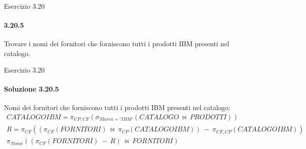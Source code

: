 %
\begin{frame}{Esercizio 3.20}
    \framesubtitle{3.20.5}
    \vspace{-3.cm}
    \vspace{.3cm}

    Trovare i nomi dei fornitori che forniscono tutti i prodotti IBM presenti nel catalogo.
\end{frame}
%
\begin{frame}{Esercizio 3.20}
    \framesubtitle{Soluzione 3.20.5}
    \vspace*{-2cm}
    \vspace{.3cm}

    {\small Nomi dei fornitori che forniscono tutti i prodotti IBM presenti nel catalogo:}
    \small
    \begin{gather*}
        CATALOGOIBM = \pi_{CP,CF} (\sigma_{Marca='IBM'} (CATALOGO~\bowtie~PRODOTTI))\\
        R = \pi_{CF}((\pi_{CF} (FORNITORI)~\bowtie~\pi_{CP}(CATALOGOIBM))~-~\pi_{CF,CP}(CATALOGOIBM))\\
        \pi_{Nome}((\pi_{CF}(FORNITORI)~-~R)~\bowtie~FORNITORI)
    \end{gather*}
\end{frame}